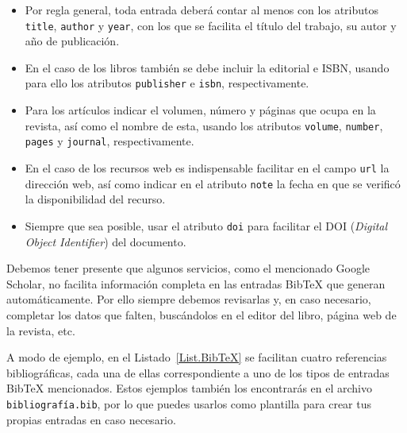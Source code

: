 \begin{itemize}
    \item  Por regla general, toda entrada deberá contar al menos con los atributos \texttt{title}, \texttt{author} y \texttt{year}, con los que se facilita el título del trabajo, su autor y año de publicación.

    \item En el caso de los libros también se debe incluir la editorial e ISBN, usando para ello los atributos \texttt{publisher} e \texttt{isbn}, respectivamente.

    \item Para los artículos indicar el volumen, número y páginas que ocupa en la revista, así como el nombre de esta, usando los atributos \texttt{volume}, \texttt{number}, \texttt{pages} y \texttt{journal}, respectivamente.

    \item En el caso de los recursos web es indispensable facilitar en el campo \texttt{url} la dirección web, así como indicar en el atributo \texttt{note} la fecha en que se verificó la disponibilidad del recurso.

    \item Siempre que sea posible, usar el atributo \texttt{doi} para facilitar el DOI (\textit{Digital Object Identifier}) del documento.
\end{itemize}

Debemos tener presente que algunos servicios, como el mencionado Google Scholar, no facilita información completa en las entradas BibTeX que generan automáticamente. Por ello siempre debemos revisarlas y, en caso necesario, completar los datos que falten, buscándolos en el editor del libro, página web de la revista, etc.

A modo de ejemplo, en el Listado~\ref{List.BibTeX} se facilitan cuatro referencias bibliográficas, cada una de ellas correspondiente a uno de los tipos de entradas BibTeX mencionados. Estos ejemplos también los encontrarás en el archivo \texttt{bibliografía.bib}, por lo que puedes usarlos como plantilla para crear tus propias entradas en caso necesario.

